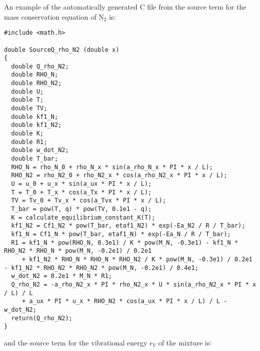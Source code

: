 \documentclass[10pt]{article}
\begin{document}
An example of the automatically generated C file from the source term for the mass conservation equation of N$_2$ is:
\begin{scriptsize}
 \begin{verbatim}
#include <math.h>

double SourceQ_rho_N2 (double x)
{
  double Q_rho_N2;
  double RHO_N;
  double RHO_N2;
  double U;
  double T;
  double TV;
  double kf1_N;
  double kf1_N2;
  double K;
  double R1;
  double w_dot_N2;
  double T_bar;
  RHO_N = rho_N_0 + rho_N_x * sin(a_rho_N_x * PI * x / L);
  RHO_N2 = rho_N2_0 + rho_N2_x * cos(a_rho_N2_x * PI * x / L);
  U = u_0 + u_x * sin(a_ux * PI * x / L);
  T = T_0 + T_x * cos(a_Tx * PI * x / L);
  TV = Tv_0 + Tv_x * cos(a_Tvx * PI * x / L);
  T_bar = pow(T, q) * pow(TV, 0.1e1 - q);
  K = calculate_equilibrium_constant_K(T);
  kf1_N2 = Cf1_N2 * pow(T_bar, etaf1_N2) * exp(-Ea_N2 / R / T_bar);
  kf1_N = Cf1_N * pow(T_bar, etaf1_N) * exp(-Ea_N / R / T_bar);
  R1 = kf1_N * pow(RHO_N, 0.3e1) / K * pow(M_N, -0.3e1) - kf1_N * RHO_N2 * RHO_N * pow(M_N, -0.2e1) / 0.2e1 
     + kf1_N2 * RHO_N * RHO_N * RHO_N2 / K * pow(M_N, -0.3e1) / 0.2e1 - kf1_N2 * RHO_N2 * RHO_N2 * pow(M_N, -0.2e1) / 0.4e1;
  w_dot_N2 = 0.2e1 * M_N * R1;
  Q_rho_N2 = -a_rho_N2_x * PI * rho_N2_x * U * sin(a_rho_N2_x * PI * x / L) / L 
     + a_ux * PI * u_x * RHO_N2 * cos(a_ux * PI * x / L) / L - w_dot_N2;
  return(Q_rho_N2);
}
 \end{verbatim}
\end{scriptsize}
%
and the source term for the vibrational energy $e_V$ of the mixture is:
\end{document}
